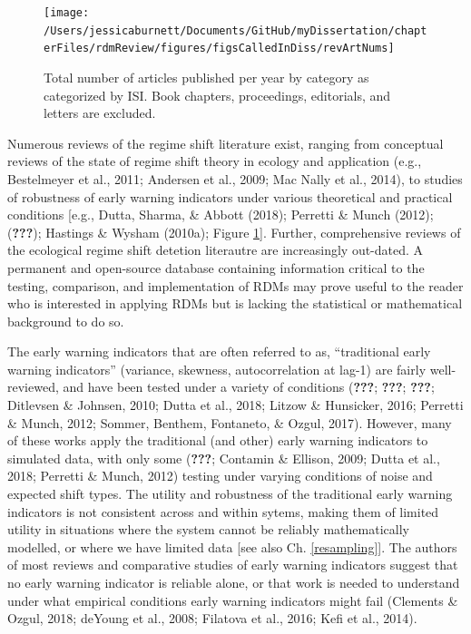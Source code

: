 \documentclass[12pt,twoside,openany]{reedthesis}
\begin{document}
\begin{figure}
\texttt{[image: /Users/jessicaburnett/Documents/GitHub/myDissertation/chapterFiles/rdmReview/figures/figsCalledInDiss/revArtNums]} \caption{Total number of articles published per year by category as categorized by ISI. Book chapters, proceedings, editorials, and letters are excluded.}\label{fig:revArtNums}
\end{figure}
Numerous reviews of the regime shift literature exist, ranging from conceptual reviews of the state of regime shift theory in ecology and application (e.g., Bestelmeyer et al., 2011; Andersen et al., 2009; Mac Nally et al., 2014), to studies of robustness of early warning indicators under various theoretical and practical conditions {[}e.g., Dutta, Sharma, \& Abbott (2018); Perretti \& Munch (2012); ({\textbf{???}}); Hastings \& Wysham (2010a); Figure \ref{fig:revArtNums}{]}. Further, comprehensive reviews of the ecological regime shift detetion literautre are increasingly out-dated. A permanent and open-source database containing information critical to the testing, comparison, and implementation of RDMs may prove useful to the reader who is interested in applying RDMs but is lacking the statistical or mathematical background to do so.

The early warning indicators that are often referred to as, ``traditional early warning indicators'' (variance, skewness, autocorrelation at lag-1) are fairly well-reviewed, and have been tested under a variety of conditions ({\textbf{???}}; {\textbf{???}}; {\textbf{???}}; Ditlevsen \& Johnsen, 2010; Dutta et al., 2018; Litzow \& Hunsicker, 2016; Perretti \& Munch, 2012; Sommer, Benthem, Fontaneto, \& Ozgul, 2017). However, many of these works apply the traditional (and other) early warning indicators to simulated data, with only some ({\textbf{???}}; Contamin \& Ellison, 2009; Dutta et al., 2018; Perretti \& Munch, 2012) testing under varying conditions of noise and expected shift types. The utility and robustness of the traditional early warning indicators is not consistent across and within sytems, making them of limited utility in situations where the system cannot be reliably mathematically modelled, or where we have limited data {[}see also Ch. \ref{resampling}{]}. The authors of most reviews and comparative studies of early warning indicators suggest that no early warning indicator is reliable alone, or that work is needed to understand under what empirical conditions early warning indicators might fail (Clements \& Ozgul, 2018; deYoung et al., 2008; Filatova et al., 2016; Kefi et al., 2014).
\end{document}
